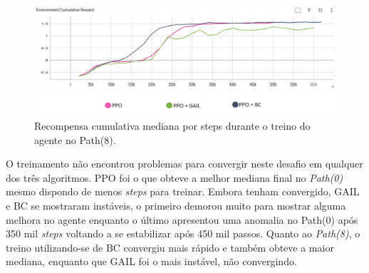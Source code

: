 \begin{figure}[h]
    \centering
    \includegraphics[scale=0.42]{figs/treinos/desafio-mediano/path8/recompensa-ppo-bc-gail-path8.png}
    \caption{Recompensa cumulativa mediana por steps durante o treino do agente no Path(8).}
\end{figure}

O treinamento não encontrou problemas para convergir neste desafio em qualquer dos três algoritmos. PPO foi o que obteve a melhor mediana final no \textit{Path(0)} mesmo dispondo de menos \textit{steps} para treinar. Embora tenham convergido, GAIL e BC se mostraram instáveis, o primeiro demorou muito para mostrar alguma melhora no agente enquanto o último apresentou uma anomalia no Path(0) após 350 mil \textit{steps} voltando a se estabilizar após 450 mil passos. Quanto ao \textit{Path(8)}, o treino utilizando-se de BC convergiu mais rápido e também obteve a maior mediana, enquanto que GAIL foi o mais instável, não convergindo.

